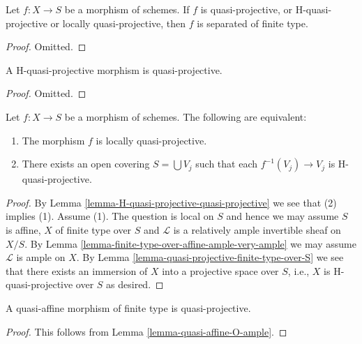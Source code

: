 \begin{lemma}
\label{lemma-quasi-projective-properties}
Let $f : X \to S$ be a morphism of schemes. If $f$ is quasi-projective,
or H-quasi-projective or locally quasi-projective, then $f$ is
separated of finite type.
\end{lemma}

\begin{proof}
Omitted.
\end{proof}

\begin{lemma}
\label{lemma-H-quasi-projective-quasi-projective}
A H-quasi-projective morphism is quasi-projective.
\end{lemma}

\begin{proof}
Omitted.
\end{proof}

\begin{lemma}
\label{lemma-characterize-locally-quasi-projective}
Let $f : X \to S$ be a morphism of schemes.
The following are equivalent:
\begin{enumerate}
\item The morphism $f$ is locally quasi-projective.
\item There exists an open covering $S = \bigcup V_j$ such
that each $f^{-1}(V_j) \to V_j$ is H-quasi-projective.
\end{enumerate}
\end{lemma}

\begin{proof}
By Lemma \ref{lemma-H-quasi-projective-quasi-projective}
we see that (2) implies (1). Assume (1).
The question is local on $S$ and hence we may assume $S$ is affine,
$X$ of finite type over $S$ and
$\mathcal{L}$ is a relatively ample invertible sheaf on $X/S$.
By Lemma \ref{lemma-finite-type-over-affine-ample-very-ample}
we may assume $\mathcal{L}$ is ample on $X$.
By Lemma \ref{lemma-quasi-projective-finite-type-over-S} we see that there
exists an immersion of $X$ into
a projective space over $S$, i.e., $X$ is H-quasi-projective over $S$
as desired.
\end{proof}

\begin{lemma}
\label{lemma-quasi-affine-finite-type-quasi-projective}
A quasi-affine morphism of finite type is quasi-projective.
\end{lemma}

\begin{proof}
This follows from Lemma \ref{lemma-quasi-affine-O-ample}.
\end{proof}

